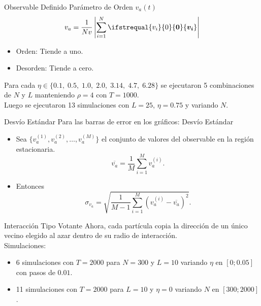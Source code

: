 \documentclass{beamer}
\renewcommand\vec[1]{\ifstrequal{#1}{0}{\ensuremath{\mathbf{0}}}{\ensuremath{\boldsymbol{#1}}}}
\begin{document}
\begin{frame}{Observable Definido}
    Parámetro de Orden $v_a(t)$
    \begin{equation*}
        v_a = \frac{1}{Nv} \left|\sum_{i=1}^{N} \vec{v_i} \right|
    \end{equation*}
    \begin{itemize}
        \item Orden: Tiende a uno.
        \item Desorden: Tiende a cero.
    \end{itemize}
    \vspace{0.5cm}
        Para cada $\eta \in \{0.1,\;0.5,\;1.0,\;2.0,\;3.14,\;4.7,\;6.28\}$ se ejecutaron 5 combinaciones de $N$ y $L$ manteniendo $\rho=4$ con $T=1000$.\\
        Luego se ejecutaron 13 simulaciones con $L=25$, $\eta=0.75$ y variando $N$.
\end{frame}

\begin{frame}{Desvío Estándar}
    Para las barras de error en los gráficos: Desvío Estándar
    \vspace{0.5cm}
    \begin{itemize}
        \item Sea $\{ v_a^{(1)}, v_a^{(2)}, \dots, v_a^{(M)} \}$ el conjunto de valores del observable en la región estacionaria.
        \begin{equation*}
            \overline{v_a} = \frac{1}{M} \sum_{i=1}^{M} v_a^{(i)} .
        \end{equation*}
        \item Entonces
        \begin{equation*}
            \sigma_{v_a} = \sqrt{\frac{1}{M-1} \sum_{i=1}^{M} \left( v_a^{(i)} - \overline{v_a} \right)^2 } .
        \end{equation*}
    \end{itemize}
\end{frame}

\begin{frame}{Interacción Tipo Votante}
    Ahora, cada partícula copia la dirección de un único vecino elegido al azar dentro de su radio de interacción.\\
    \vspace{0.5cm}
    Simulaciones:
    \begin{itemize}
        \item 6 simulaciones con $T=2000$ para $N=300$ y $L=10$ variando $\eta$ en $[0;0.05]$ con pasos de $0.01$.
        \item 11 simulaciones con $T=2000$ para $L=10$ y $\eta=0$ variando $N$ en $[300;2000]$.
    \end{itemize}
\end{frame}
\end{document}
